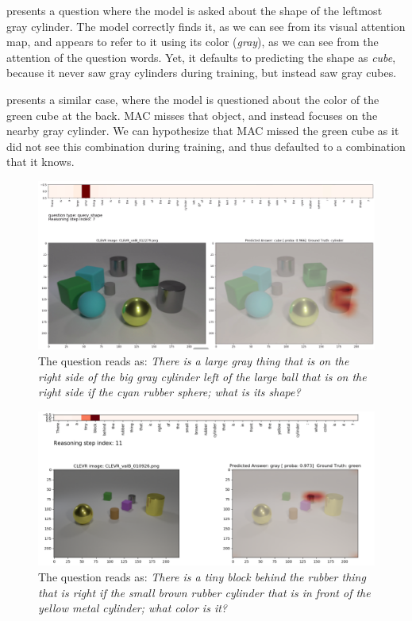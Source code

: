  presents a question where the model is asked about the shape of the leftmost gray cylinder. The model correctly finds it, as we can see from its visual attention map, and appears to refer to it using its color (\textit{gray}), as we can see from the attention of the question words. Yet, it defaults to predicting the shape as \textit{cube}, because it never saw gray cylinders during training, but instead saw gray cubes.

 presents a similar case, where the model is questioned about the color of the green cube at the back. MAC misses that object, and instead focuses on the nearby gray cylinder. We can hypothesize that MAC missed the green cube as it did not see this combination during training, and thus defaulted to a combination that it knows.


\begin{figure}[htbp]
	\centering
	\includegraphics[width=\textwidth]{img/fail_mac_cogent_b_shape.png}
	\caption{The question reads as: \textit{There is a large gray thing that is on the right side of the big gray cylinder left of the large ball that is on the right side if the cyan rubber sphere; what is its shape?}}
	\label{fig:fail_mac_shape}
\end{figure}

\begin{figure}[htbp]
	\centering
	\includegraphics[width=\textwidth]{img/fail_mac_cogent_b_color.png}
	\caption{The question reads as: \textit{There is a tiny block behind the rubber thing that is right if the small brown rubber cylinder that is in front of the yellow metal cylinder; what color is it?}}
	\label{fig:fail_mac_color}
\end{figure}


